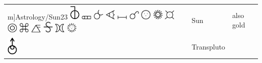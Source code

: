 \documentclass[british,final,landscape]{scrartcl}
\begin{document}
\begin{refsection}
\begin{supertabular}{p{0.3\textwidth}p{0.34\textwidth}p{0.34\textwidth}}
m]{Astrology/Sun23} \includegraphics[width=5mm]{Astrology/Sun24} \includegraphics[width=5mm]{Astrology/Sun25} \includegraphics[width=5mm]{Astrology/Sun26} \includegraphics[width=5mm]{Astrology/Sun27} \includegraphics[width=5mm]{Astrology/Sun28} \includegraphics[width=5mm]{Astrology/Sun29} \includegraphics[width=5mm]{Astrology/Sun30} \includegraphics[width=5mm]{Astrology/Sun31} \includegraphics[width=5mm]{Astrology/Sun32} \includegraphics[width=5mm]{Astrology/Sun33} \includegraphics[width=5mm]{Astrology/Sun34} \includegraphics[width=5mm]{Astrology/Sun35} \includegraphics[width=5mm]{Astrology/Sun36} \includegraphics[width=5mm]{Astrology/Sun37} \includegraphics[width=5mm]{Astrology/Sun38} & Sun                 & also gold \\
  \includegraphics[width=5mm]{Astrology/Transpluto} & Transpluto & \\
\end{supertabular}


\end{refsection}
\end{document}
